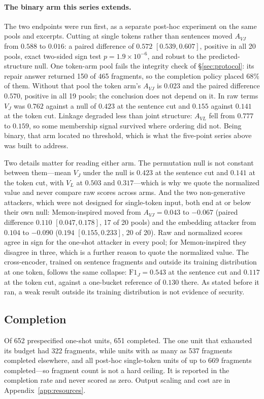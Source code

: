 \documentclass[sigconf,review]{acmart}
\newcommand{\FJ}{\ensuremath{\mathrm{F1}_{J}}}
\newcommand{\VJ}{\ensuremath{V_{J}}}
\newcommand{\VL}{\ensuremath{V_{L}}}
\newcommand{\AVJ}{\ensuremath{A_{VJ}}}
\newcommand{\AVL}{\ensuremath{A_{VL}}}
\begin{document}
\paragraph{The binary arm this series extends.}
The two endpoints were run first, as a separate post-hoc experiment on the same
pools and excerpts. Cutting at single tokens rather than sentences moved \AVJ{}
from $0.588$ to $0.016$: a paired difference of $0.572$ $[0.539, 0.607]$,
positive in all 20 pools, exact two-sided sign test $p = 1.9\times10^{-6}$, and
robust to the predicted-structure null. One token-arm pool fails the
integrity check of \S\ref{sec:protocol}: its repair answer returned 150 of 465
fragments, so the completion policy placed $68\%$ of them. Without that pool
the token arm's \AVJ{} is $0.023$ and the paired difference $0.570$, positive
in all 19 pools; the conclusion does not depend on it. In raw terms \VJ{} was $0.762$ against
a null of $0.423$ at the sentence cut and $0.155$ against $0.141$ at the token
cut. Linkage degraded less than joint structure: \AVL{} fell from $0.777$ to
$0.159$, so some membership signal survived where ordering did not. Being
binary, that arm located no threshold, which is what the five-point series
above was built to address.

Two details matter for reading either arm. The permutation null is not constant
between them---mean \VJ{} under the null is $0.423$ at the sentence cut and
$0.141$ at the token cut, with \VL{} at $0.503$ and $0.317$---which is why we
quote the normalized value and never compare raw scores across arms. And the
two non-generative attackers, which were not designed for single-token input,
both end at or below their own null: Memon-inspired moved from $\AVJ = 0.043$
to $-0.067$ (paired difference $0.110$ $[0.047, 0.178]$, 17 of 20 pools) and
the embedding attacker from $0.104$ to $-0.090$ ($0.194$ $[0.155, 0.233]$, 20
of 20). Raw and normalized scores agree in sign for the one-shot attacker in
every pool; for Memon-inspired they disagree in three, which is a further
reason to quote the normalized value. The cross-encoder, trained on sentence
fragments and outside its training distribution at one token, follows the same
collapse: $\FJ = 0.543$ at the sentence cut and $0.117$ at the token cut,
against a one-bucket reference of $0.130$ there. As stated before it ran, a
weak result outside its training distribution is not evidence of security.

\subsection{Completion}
\label{sec:res-resources}
Of 652 prespecified one-shot units, 651 completed. The one unit that exhausted
its budget had 322 fragments, while units with as many as 537 fragments
completed elsewhere, and all post-hoc single-token units of up to 669
fragments completed---so fragment count is not a hard ceiling. It is reported in the
completion rate and never scored as zero. Output scaling and cost are in
Appendix~\ref{app:resources}.
\end{document}
